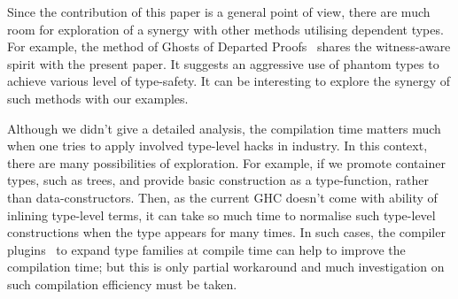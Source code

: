\documentclass[demotion-paper.tex]{subfiles}
\begin{document}
Since the contribution of this paper is a general point of view, there are much room for exploration of a synergy with other methods utilising dependent types.
For example, the method of Ghosts of Departed Proofs~\cite{Noonan:2018aa} shares the witness-aware spirit with the present paper.
It suggests an aggressive use of phantom types to achieve various level of type-safety.
It can be interesting to explore the synergy of such methods with our examples.

Although we didn't give a detailed analysis, the compilation time matters much when one tries to apply involved type-level hacks in industry.
In this context, there are many possibilities of exploration.
For example, if we promote container types, such as trees, and provide basic construction as a type-function, rather than data-constructors.
Then, as the current GHC doesn't come with ability of inlining type-level terms, it can take so much time to normalise such type-level constructions when the type appears for many times.
In such cases, the compiler plugins~\cite{GHC-Team:2020aa} to expand type families at compile time can help to improve the compilation time; but this is only partial workaround and much investigation on such compilation efficiency must be taken.
\end{document}
